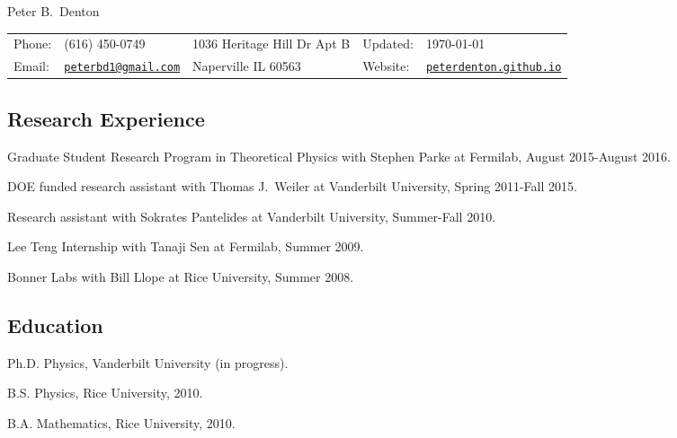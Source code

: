 \documentclass[letterpaper]{article}
\def\name{Peter B.~Denton}
\renewenvironment{itemize}{
\begin{list}{}{
\setlength{\leftmargin}{1.5em}
}
}{
\end{list}
}
\begin{document}
{\huge \name}

\vspace{0.1in}

\begin{tabular}{ll|l|ll}
Phone: & (616) 450-0749 & 1036 Heritage Hill Dr Apt B & Updated: & \today\\
Email: & \href{mailto:peterbd1@gmail.com}{\tt peterbd1@gmail.com} & Naperville IL 60563 & Website: & 
\href{http://peterdenton.github.io}{\tt peterdenton.github.io}
\end{tabular}

\subsection*{Research Experience}
\begin{itemize}
\item Graduate Student Research Program in Theoretical Physics with Stephen Parke at Fermilab, August 2015-August 2016.
\item DOE funded research assistant with Thomas J.~Weiler at Vanderbilt University, Spring 2011-Fall 2015.
\item Research assistant with Sokrates Pantelides at Vanderbilt University, Summer-Fall 2010.
\item Lee Teng Internship with Tanaji Sen at Fermilab, Summer 2009.
\item Bonner Labs with Bill Llope at Rice University, Summer 2008.
\end{itemize}

\subsection*{Education}
\begin{itemize}
\item Ph.D. Physics, Vanderbilt University (in progress).
\item B.S. Physics, Rice University, 2010.
\item B.A. Mathematics, Rice University, 2010.
\end{itemize}
\end{document}
